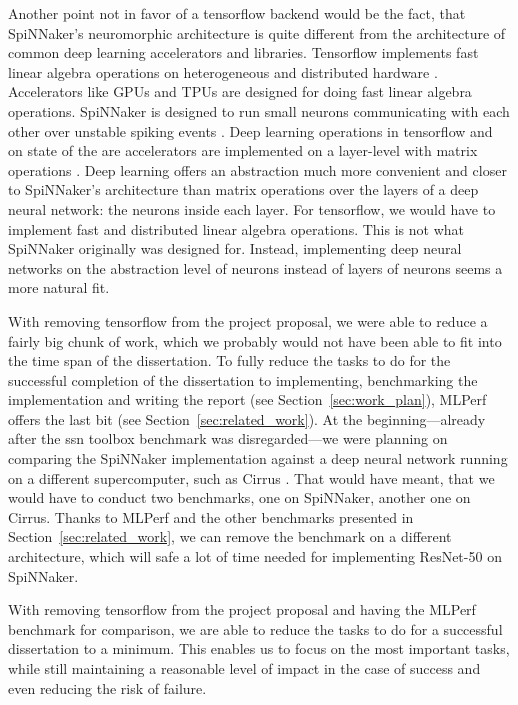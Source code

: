 \documentclass{article}
\begin{document}
Another point not in favor of a tensorflow backend would be
the fact, that SpiNNaker's neuromorphic architecture is
quite different from the architecture of common deep
learning accelerators and libraries.
Tensorflow implements fast linear algebra operations on
heterogeneous and distributed hardware \citep{tf2015}.
Accelerators like GPUs and TPUs are designed for doing
fast linear algebra operations.
SpiNNaker is designed to run small neurons communicating
with each other over unstable spiking events
\citep{furber_et_al_2007}.
Deep learning operations in tensorflow and on state of the
are accelerators are implemented on a layer-level with
matrix operations \citep{goodfellow2016}.
Deep learning offers an abstraction much more convenient
and closer to SpiNNaker's architecture than matrix
operations over the layers of a deep neural network: the
neurons inside each layer.
For tensorflow, we would have to implement fast and
distributed linear algebra operations.
This is not what SpiNNaker originally was designed for.
Instead, implementing deep neural networks on the
abstraction level of neurons instead of layers of neurons
seems a more natural fit.

With removing tensorflow from the project proposal, we
were able to reduce a fairly big chunk of work, which we
probably would not have been able to fit into the time
span of the dissertation.
To fully reduce the tasks to do for the successful
completion of the dissertation to implementing,
benchmarking the implementation and writing the report
(see Section~\ref{sec:work_plan}), MLPerf offers the last
bit (see Section~\ref{sec:related_work}).
At the beginning---already after the ssn toolbox benchmark
was disregarded---we were planning on comparing the
SpiNNaker implementation against a deep neural network
running on a different supercomputer, such as Cirrus
\citep{cirrus}.
That would have meant, that we would have to conduct two
benchmarks, one on SpiNNaker, another one on Cirrus.
Thanks to MLPerf and the other benchmarks presented in
Section~\ref{sec:related_work}, we can remove the
benchmark on a different architecture, which will safe
a lot of time needed for implementing ResNet-50 on
SpiNNaker.

With removing tensorflow from the project proposal and
having the MLPerf benchmark for comparison, we are able
to reduce the tasks to do for a successful dissertation to
a minimum.
This enables us to focus on the most important tasks, while
still maintaining a reasonable level of impact in the case
of success and even reducing the risk of failure.
\end{document}
